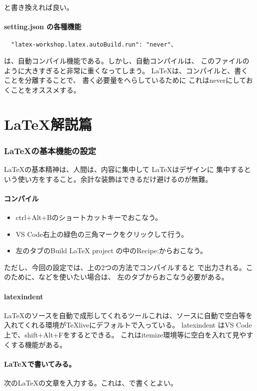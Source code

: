 \documentclass{ltjsarticle}
\begin{document}
と書き換えれば良い。
\subsection{setting.json の各種機能}
\begin{verbatim}
  "latex-workshop.latex.autoBuild.run": "never"、
\end{verbatim}
は、自動コンパイル機能である。しかし、自動コンパイルは、
このファイルのように大きすぎると非常に重くなってしまう。
\LaTeX は、コンパイルと、書くことを分離することで、
書く必要量をへらしているために
これはneverにしておくことをオススメする。

\part{\LaTeX 解説篇}
\section{\LaTeX の基本機能の設定}
\LaTeX の基本精神は、人間は、内容に集中して \LaTeX はデザインに
集中するという使い方をすること。余計な装飾はできるだけ避けるのが無難。
\subsection{コンパイル}
\begin{itemize}
  \item ctrl+Alt+Bのショートカットキーでおこなう。
  \item VS Code右上の緑色の三角マークをクリックして行う。
  \item 左のタブのBuild LaTeX project の中のRecipe:からおこなう。
\end{itemize}
ただし、今回の設定では、上の2つの方法でコンパイルすると\LuaLaTeX
で出力される。このために、\upLaTeX などを使いたい場合は、
左のタブからおこなう必要がある。
\subsection{latexindent}
\LaTeX のソースを自動で成形してくれるツールこれは、ソースに自動で空白等を
入れてくれる環境がTeXliveにデフォルトで入っている。
latexindent はVS Code上で、shift+Alt+Fをするとできる。
これはitemize環境等に空白を入れて見やすくする機能がある。
\subsection{\LaTeX で書いてみる。}
次の\LaTeX の文章を入力する。これは、\LuaLaTeX で書くとよい。
\end{document}
